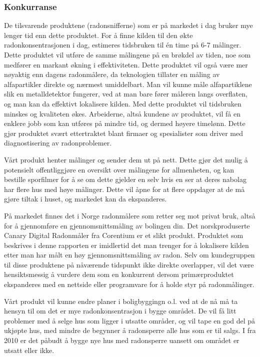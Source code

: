 \subsubsection{Konkurranse}
De tilsvarende produktene (radonsnifferne) som er på markedet i dag bruker mye lenger tid enn dette produktet. For å finne kilden til den økte radonkonsentrasjonen i dag, estimeres tidsbruken til én time på 6-7 målinger. Dette produktet vil utføre de samme målingene på en brøkdel av tiden, noe som medfører en markant økning i effektiviteten. Dette produktet vil også være mer nøyaktig enn dagens radonmålere, da teknologien tillater en måling av alfapartikler direkte og nærmest umiddelbart. Man vil kunne måle alfapartiklene slik en metalldetektor fungerer, ved at man bare fører måleren langs overflaten, og man kan da effektivt lokalisere kilden. Med dette produktet vil tidsbruken minskes og kvaliteten økes. Arbeiderne, altså kundene av produktet, vil få en enklere jobb som kan utføres på mindre tid, og dermed høyere timelønn. Dette gjør produktet svært ettertraktet blant firmaer og spesialister som driver med diagnostisering av radonproblemer.

Vårt produkt henter målinger og sender dem ut på nett. Dette gjør det mulig å potensielt offentliggjøre en oversikt over målingene for allmenheten, og kan bestille sporfilmer for å se om dette gjelder en selv hvis en ser at deres nabolag har flere hus med høye målinger. Dette vil åpne for at flere oppdager at de må gjøre tiltak i huset, og markedet kan da ekspanderes.

På markedet finnes det i Norge radonmålere som retter seg mot privat bruk, altså for å gjennomføre en gjennomsnittsmåling av bolingen din. Det norskproduserte Canary Digital Radonmåler fra Corentium er et slikt produkt. Produktet som beskrives i denne rapporten er imidlertid det man trenger for å lokalisere kilden etter man har målt en høy gjennomsnittsmåling av radon. Selv om kundegruppen til disse produktene på nåværende tidspunkt ikke direkte overlapper, vil det være hensiktsmessig å vurdere dem som en konkurrent dersom primærproduktet ekspanderes med en nettside eller programvare for å holde styr på radonmålinger.

Vårt produkt vil kunne endre planer i boligbyggingn o.l. ved at de nå må ta hensyn til om det er mye radonkonsentrasjon
i bygge området. De vil få litt problemer med å selge hus som ligger i utsatte områder, og vil tape en god del på
ukjøpte hus, med mindre de begynner å radonsperre alle hus som er til salgs. I fra 2010 er det påbudt å bygge nye 
hus med radonsperre uansett om området er utsatt eller ikke.

